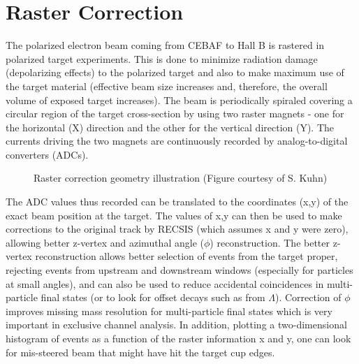 \section{Raster Correction}




The polarized electron beam coming from CEBAF to Hall B is rastered in polarized target experiments. This 
is done to minimize radiation damage (depolarizing effects) to the polarized target and also to make maximum use of 
the target material (effective beam size increases and, therefore, the overall volume of exposed target increases). 
The beam is periodically spiraled covering a circular region of the target cross-section by using two raster 
magnets - one for the horizontal (X) direction and the other for the vertical direction (Y). The currents driving 
the two magnets are continuously recorded by analog-to-digital converters (ADCs).

\begin{figure}[htpb] %
\centerline{}
\caption{Raster correction geometry illustration (Figure courtesy of S. Kuhn)}
\label{fig:RstGeoKuhn1}
\end{figure}

The ADC values thus recorded can be translated to the coordinates (x,y) of the exact beam position at the target. The values of x,y can then be used to make corrections to the original track by RECSIS (which assumes x and y were zero), allowing better z-vertex and azimuthal angle ($\phi$) reconstruction. The better z-vertex reconstruction allows better selection of events from the target proper, rejecting events from upstream and downstream %
windows (especially for particles at small angles), and can also be used to reduce accidental coincidences in multi-particle final states (or to look for offset decays such as from $\Lambda$). Correction of $\phi$ improves missing mass resolution for multi-particle final states which is very important in exclusive channel analysis. In addition, plotting a two-dimensional histogram of events as a function of the raster information x and y, one can look for mis-steered beam that might have hit the target cup edges.

